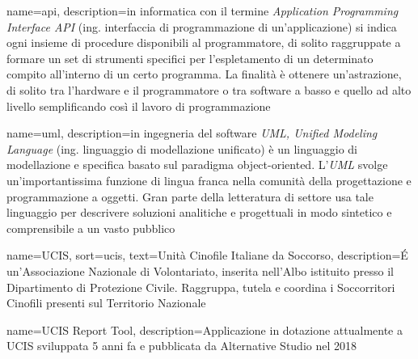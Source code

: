 \makeglossaries
\renewcommand{\acronymname}{Acronimi e abbreviazioni}


\renewcommand{\glossaryname}{Glossario}

{
    name=api,
    description={in informatica con il termine \emph{Application Programming Interface API} (ing. interfaccia di programmazione di un'applicazione) si indica ogni insieme di procedure disponibili al programmatore, di solito raggruppate a formare un set di strumenti specifici per l'espletamento di un determinato compito all'interno di un certo programma. La finalità è ottenere un'astrazione, di solito tra l'hardware e il programmatore o tra software a basso e quello ad alto livello semplificando così il lavoro di programmazione}
}

{
    name=uml,
    description={in ingegneria del software \emph{UML, Unified Modeling Language} (ing. linguaggio di modellazione unificato) è un linguaggio di modellazione e specifica basato sul paradigma object-oriented. L'\emph{UML} svolge un'importantissima funzione di lingua franca nella comunità della progettazione e programmazione a oggetti. Gran parte della letteratura di settore usa tale linguaggio per descrivere soluzioni analitiche e progettuali in modo sintetico e comprensibile a un vasto pubblico}
}

{
    name=UCIS,
    sort=ucis,
    text=Unità Cinofile Italiane da Soccorso,
    description={É un'Associazione Nazionale di Volontariato, inserita nell'Albo istituito presso il Dipartimento di Protezione Civile. Raggruppa, tutela e coordina i Soccorritori Cinofili presenti sul Territorio Nazionale}
}

{
  name=UCIS Report Tool,
  description={Applicazione in dotazione attualmente a UCIS sviluppata 5 anni fa e pubblicata da Alternative Studio nel 2018}
}

